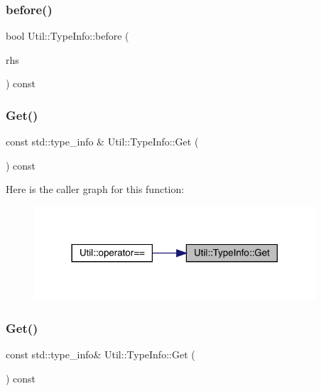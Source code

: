 \subsubsection{\texorpdfstring{before()}{before()}\hspace{0.1cm}{\footnotesize\ttfamily [2/2]}}
{\footnotesize\ttfamily bool Util\+::\+Type\+Info\+::before (\begin{DoxyParamCaption}\item[{const \mbox{\hyperlink{classUtil_1_1TypeInfo}{Type\+Info}} \&}]{rhs }\end{DoxyParamCaption}) const}

\mbox{\label{classUtil_1_1TypeInfo_ad5aa0be0eb3620266822b8c55bd43ce7}} 
\subsubsection{\texorpdfstring{Get()}{Get()}\hspace{0.1cm}{\footnotesize\ttfamily [1/2]}}
{\footnotesize\ttfamily const std\+::type\+\_\+info \& Util\+::\+Type\+Info\+::\+Get (\begin{DoxyParamCaption}{ }\end{DoxyParamCaption}) const\hspace{0.3cm}{\ttfamily [inline]}}

Here is the caller graph for this function\+:\nopagebreak
\begin{figure}[H]
\begin{center}
\leavevmode
\includegraphics[width=297pt]{d5/d37/classUtil_1_1TypeInfo_ad5aa0be0eb3620266822b8c55bd43ce7_icgraph}
\end{center}
\end{figure}
\mbox{\label{classUtil_1_1TypeInfo_af201eec5ca4934cd5d8312d6458ec605}} 
\subsubsection{\texorpdfstring{Get()}{Get()}\hspace{0.1cm}{\footnotesize\ttfamily [2/2]}}
{\footnotesize\ttfamily const std\+::type\+\_\+info\& Util\+::\+Type\+Info\+::\+Get (\begin{DoxyParamCaption}{ }\end{DoxyParamCaption}) const}

